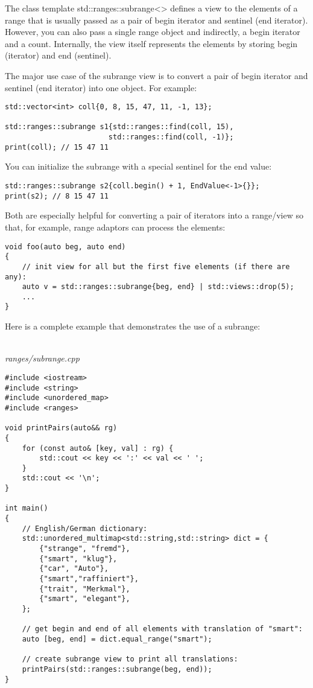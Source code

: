 The class template std::ranges::subrange<> defines a view to the elements of a range that is usually passed as a pair of begin iterator and sentinel (end iterator). However, you can also pass a single range object and indirectly, a begin iterator and a count. Internally, the view itself represents the elements by storing begin (iterator) and end (sentinel).

The major use case of the subrange view is to convert a pair of begin iterator and sentinel (end iterator) into one object. For example:

\begin{lstlisting}[style=styleCXX]
std::vector<int> coll{0, 8, 15, 47, 11, -1, 13};

std::ranges::subrange s1{std::ranges::find(coll, 15),
						std::ranges::find(coll, -1)};
print(coll); // 15 47 11
\end{lstlisting}

You can initialize the subrange with a special sentinel for the end value:

\begin{lstlisting}[style=styleCXX]
std::ranges::subrange s2{coll.begin() + 1, EndValue<-1>{}};
print(s2); // 8 15 47 11
\end{lstlisting}

Both are especially helpful for converting a pair of iterators into a range/view so that, for example, range adaptors can process the elements:

\begin{lstlisting}[style=styleCXX]
void foo(auto beg, auto end)
{
	// init view for all but the first five elements (if there are any):
	auto v = std::ranges::subrange{beg, end} | std::views::drop(5);
	...
}
\end{lstlisting}

Here is a complete example that demonstrates the use of a subrange:

\noindent
\hspace*{\fill} \\ %
\textit{ranges/subrange.cpp}

\begin{lstlisting}[style=styleCXX]
#include <iostream>
#include <string>
#include <unordered_map>
#include <ranges>

void printPairs(auto&& rg)
{
	for (const auto& [key, val] : rg) {
		std::cout << key << ':' << val << ' ';
	}
	std::cout << '\n';
}

int main()
{
	// English/German dictionary:
	std::unordered_multimap<std::string,std::string> dict = {
		{"strange", "fremd"},
		{"smart", "klug"},
		{"car", "Auto"},
		{"smart","raffiniert"},
		{"trait", "Merkmal"},
		{"smart", "elegant"},
	};
	
	// get begin and end of all elements with translation of "smart":
	auto [beg, end] = dict.equal_range("smart");
	
	// create subrange view to print all translations:
	printPairs(std::ranges::subrange(beg, end));
}
\end{lstlisting}

